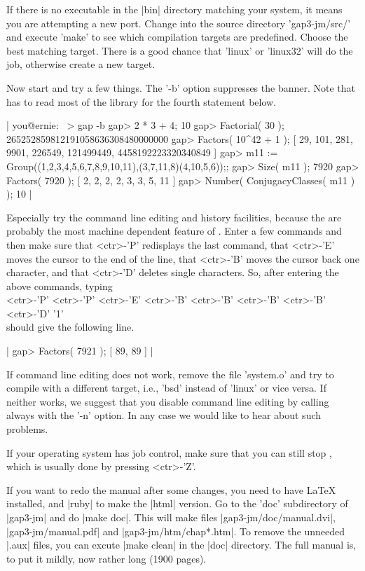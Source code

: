 If  there is no executable in the  |bin| directory matching your system, it
means  you  are  attempting  a  new  port. Change into the source directory
'gap3-jm/src/'  and  execute  'make'  to  see which compilation targets are
predefined.  Choose the best  matching target. There  is a good chance that
'linux' or 'linux32' will do the job, otherwise create a new target.

Now  start {\GAP}  and try  a few  things. The  '-b' option suppresses the
banner.  Note that {\GAP} has  to read most of  the library for the fourth
statement  below.

|    you@ernie:~ > gap -b
    gap> 2 * 3 + 4;
    10
    gap> Factorial( 30 );
    265252859812191058636308480000000
    gap> Factors( 10^42 + 1 );
    [ 29, 101, 281, 9901, 226549, 121499449, 4458192223320340849 ]
    gap> m11 := Group((1,2,3,4,5,6,7,8,9,10,11),(3,7,11,8)(4,10,5,6));;
    gap> Size( m11 );
    7920
    gap> Factors( 7920 );
    [ 2, 2, 2, 2, 3, 3, 5, 11 ]
    gap> Number( ConjugacyClasses( m11 ) );
    10 |

Especially try the command line editing and history facilities, because the
are  probably the  most machine  dependent feature  of {\GAP}. Enter a few
commands  and then  make sure  that <ctr>-'P'  redisplays the last command,
that  <ctr>-'E' moves  the cursor  to the  end of  the line, that <ctr>-'B'
moves the cursor back one character, and that <ctr>-'D' deletes single
characters.  So, after entering the above commands, typing\\
<ctr>-'P' <ctr>-'P' <ctr>-'E' <ctr>-'B' 
<ctr>-'B' <ctr>-'B' <ctr>-'B' <ctr>-'D' '1'\\
should give the following line.

|    gap> Factors( 7921 );
    [ 89, 89 ] |

If  command line editing does not work,  remove the file 'system.o' and try
to  compile with a different target, i.e., 'bsd' instead of 'linux' or vice
versa.  If neither works, we suggest  that you disable command line editing
by  calling {\GAP} always with the '-n'  option. In any case we would like
to hear about such problems.

If your operating  system has job control, make  sure that  you can still
stop {\GAP}, which is usually done by pressing <ctr>-'Z'.

If  you  want  to  redo  the  manual  after  some changes, you need to have
{\LaTeX}  installed, and |ruby| to make the |html| version. Go to the 'doc'
subdirectory  of  |gap3-jm|  and  do  |make  doc|.  This  will  make  files
|gap3-jm/doc/manual.dvi|, |gap3-jm/manual.pdf| and |gap3-jm/htm/chap*.htm|.
To  remove the unneeded  |.aux| files, you  can excute |make  clean| in the
|doc|  directory. The  full manual  is, to  put it  mildly, now rather long
(1900  pages). 

